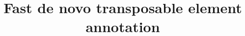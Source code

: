 \documentclass{bmcart}
\begin{document}
\begin{frontmatter}

\begin{fmbox}


\title{Fast de novo transposable element annotation}


\author[
   addressref={aff1},
   noteref={n1},
   email={schaefce@miamiOH.edu}
]{ }
\author[
   addressref={aff1},                   %
   noteref={n1},                        %
   email={figuernd@miamiOH.edu}   %
]{ }
\author[
   addressref={aff1,aff2},
   email={liux17@miamiOH.edu}
]{ }
\author[
  addressref={aff1,aff2,aff3,aff4},
  corref={aff1},
  noteref={n2},
  email={karroje@miamiOH.edu}
]{ }



\end{fmbox}
\end{frontmatter}
\end{document}
